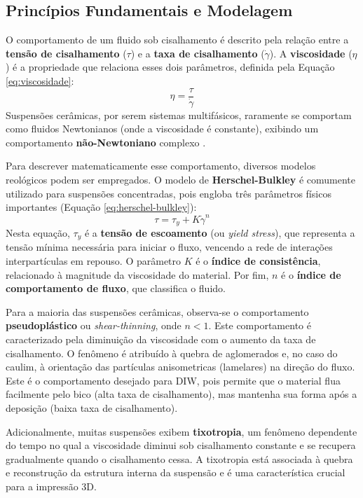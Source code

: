 \documentclass[article,12pt,oneside,a4paper,english,brazil,sumario=tradicional]{abntex2}
\begin{document}
\subsection{Princípios Fundamentais e Modelagem}
O comportamento de um fluido sob cisalhamento é descrito pela relação entre a \textbf{tensão de cisalhamento} ($\tau$) e a \textbf{taxa de cisalhamento} ($\dot{\gamma}$). A \textbf{viscosidade} ($\eta$) é a propriedade que relaciona esses dois parâmetros, definida pela Equação \ref{eq:viscosidade}:
\begin{equation} \label{eq:viscosidade}
    \eta = \frac{\tau}{\dot{\gamma}}
\end{equation}
Suspensões cerâmicas, por serem sistemas multifásicos, raramente se comportam como fluidos Newtonianos (onde a viscosidade é constante), exibindo um comportamento \textbf{não-Newtoniano} complexo .

Para descrever matematicamente esse comportamento, diversos modelos reológicos podem ser empregados. O modelo de \textbf{Herschel-Bulkley} é comumente utilizado para suspensões concentradas, pois engloba três parâmetros físicos importantes (Equação \ref{eq:herschel-bulkley}):
\begin{equation} \label{eq:herschel-bulkley}
    \tau = \tau_y + K\dot{\gamma}^n
\end{equation}
Nesta equação, $\tau_y$ é a \textbf{tensão de escoamento} (ou \textit{yield stress}), que representa a tensão mínima necessária para iniciar o fluxo, vencendo a rede de interações interpartículas em repouso. O parâmetro $K$ é o \textbf{índice de consistência}, relacionado à magnitude da viscosidade do material. Por fim, $n$ é o \textbf{índice de comportamento de fluxo}, que classifica o fluido.

Para a maioria das suspensões cerâmicas, observa-se o comportamento \textbf{pseudoplástico} ou \textit{shear-thinning}, onde $n < 1$. Este comportamento é caracterizado pela diminuição da viscosidade com o aumento da taxa de cisalhamento. O fenômeno é atribuído à quebra de aglomerados e, no caso do caulim, à orientação das partículas anisometricas (lamelares) na direção do fluxo. Este é o comportamento desejado para DIW, pois permite que o material flua facilmente pelo bico (alta taxa de cisalhamento), mas mantenha sua forma após a deposição (baixa taxa de cisalhamento).

Adicionalmente, muitas suspensões exibem \textbf{tixotropia}, um fenômeno dependente do tempo no qual a viscosidade diminui sob cisalhamento constante e se recupera gradualmente quando o cisalhamento cessa. A tixotropia está associada à quebra e reconstrução da estrutura interna da suspensão e é uma característica crucial para a impressão 3D.
\end{document}
